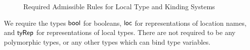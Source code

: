 \begin{figure}
  \caption[Required Admissible Rules]{Required Admissible Rules for Local Type and Kinding Systems}
  \label{fig:local-type-rules}
\end{figure}

We require the types $\mathsf{bool}$ for booleans, $\mathsf{loc}$ for representations of location names, and $\mathsf{tyRep}$ for representations of local types.
There are not required to be any polymorphic types, or any other types which can bind type variables.

